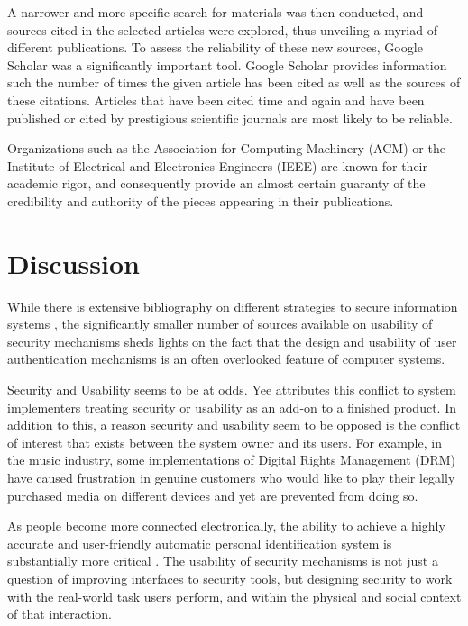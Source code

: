 \documentclass{article}
\begin{document}
A narrower and more specific search for materials was then conducted, and sources cited in the selected articles were explored, thus unveiling a myriad of different publications. To assess the reliability of these new sources, Google Scholar was a significantly important tool. Google Scholar provides information such the number of times the given article has been cited as well as the sources of these citations.  Articles that have been cited time and again and have been published or cited by prestigious scientific journals are most likely to be reliable.

Organizations such as the Association for Computing Machinery (ACM) or the Institute of Electrical and Electronics Engineers (IEEE) are known for their academic rigor, and consequently provide an almost certain guaranty of the credibility and authority of the pieces appearing in their publications. 


\section{Discussion}
While there is extensive bibliography on different strategies to secure information systems , the significantly smaller number of sources available on usability of security mechanisms sheds lights on the fact that the design and usability of user authentication mechanisms is an often overlooked feature of computer systems.

Security and Usability seems to be at odds. Yee\cite{yee2004aligning} attributes this conflict to system implementers treating security or usability as an add-on to a finished product. In addition to this, a reason security and usability seem to be opposed is the conflict of interest that exists between the system owner and its users. For example, in the music industry, some implementations of Digital Rights Management (DRM) have caused frustration in genuine customers who would like to play their legally purchased media on different devices and yet are prevented from doing so. 

As people become more connected electronically, the ability to achieve a highly accurate and user-friendly automatic personal identification system is substantially more critical \cite{jain2000biometric}. The usability of security mechanisms is not just a question of improving interfaces to security tools, but designing security to work with the real-world task users perform, and within the physical and social context of that interaction. 
\end{document}
